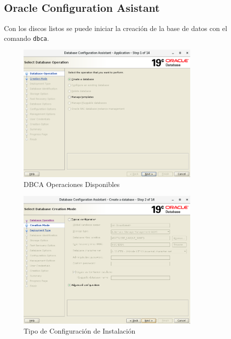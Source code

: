 \documentclass{article}
\begin{document}
\subsection{Oracle Configuration Asistant}

Con los discos listos se puede iniciar la creación de la base de datos con el comando \texttt{dbca}.


\begin{figure}[H]
		\begin{center}
			\includegraphics[width=0.80\textwidth]{db_creation_2_database_operation.png}
		\end{center}
		\caption{DBCA Operaciones Disponibles}
\end{figure}


\begin{figure}[H]
		\begin{center}
			\includegraphics[width=0.80\textwidth]{db_creation_3_creation_mode.png}
		\end{center}
		\caption{Tipo de Configuración de Instalación}
\end{figure}
\end{document}
